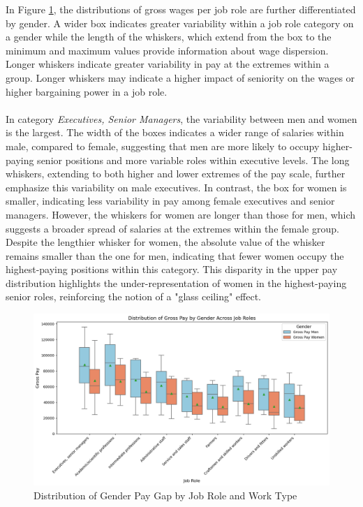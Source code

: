 \documentclass{article}
\begin{document}
In Figure \ref{fig:distribution_gross}, the distributions of gross wages per job role are further differentiated by gender. A wider box indicates greater variability within a job role category on a gender while the length of the whiskers, which extend from the box to the minimum and maximum values provide information about wage dispersion. Longer whiskers indicate greater variability in pay at the extremes within a group. Longer whiskers may indicate a higher impact of seniority on the wages or higher bargaining power in a job role. \\
\\
In category \textit{Executives, Senior Managers}, the variability between men and women is the largest. The width of the boxes indicates a wider range of salaries within male, compared to female, suggesting that men are more likely to occupy higher-paying senior positions and more variable roles within executive levels. The long whiskers, extending to both higher and lower extremes of the pay scale, further emphasize this variability on male executives. In contrast, the box for women is smaller, indicating less variability in pay among female executives and senior managers. However, the whiskers for women are longer than those for men, which suggests a broader spread of salaries at the extremes within the female group. \\
Despite the lengthier whisker for women, the absolute value of the whisker remains smaller than the one for men, indicating that fewer women occupy the highest-paying positions within this category. This disparity in the upper pay distribution highlights the under-representation of women in the highest-paying senior roles, reinforcing the notion of a "glass ceiling" effect. 
\clearpage

\begin{figure}[t]
    \centering
    \includegraphics[width=1\textwidth]{Figures/Distribution_Gross-Pay.png}
    \caption{Distribution of Gender Pay Gap by Job Role and Work Type}
    \label{fig:distribution_gross}
\end{figure}
\end{document}
